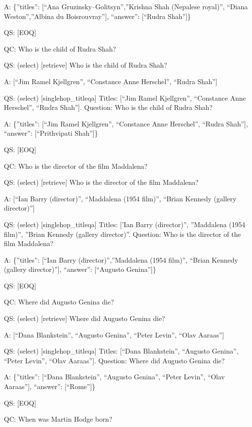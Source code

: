 \documentclass[
]{article}
\begin{document}
A: \{''titles'': {[}``Ana Gruzinsky--Golitsyn'',''Krishna Shah (Nepalese
royal)'', ``Diana Weston'',''Albina du Boisrouvray''{]}, ``answer'':
{[}``Rudra Shah''{]}\}

QS: {[}EOQ{]}

QC: Who is the child of Rudra Shah?

QS: (select) {[}retrieve{]} Who is the child of Rudra Shah?

A: {[}``Jim Ramel Kjellgren'', ``Constance Anne Herschel'', ``Rudra
Shah''{]}

QS: (select) {[}singlehop\_titleqa{]} Titles: {[}``Jim Ramel
Kjellgren'', ``Constance Anne Herschel'', ``Rudra Shah''{]}. Question:
Who is the child of Rudra Shah?

A: \{''titles'': {[}``Jim Ramel Kjellgren'', ``Constance Anne
Herschel'', ``Rudra Shah''{]}, ``answer'': {[}``Prithvipati Shah''{]}\}

QS: {[}EOQ{]}

QC: Who is the director of the film Maddalena?

QS: (select) {[}retrieve{]} Who is the director of the film Maddalena?

A: {[}``Ian Barry (director)'', ``Maddalena (1954 film)'', ``Brian
Kennedy (gallery director)''{]}

QS: (select) {[}singlehop\_titleqa{]} Titles: {[}'Ian Barry
(director)'', ''Maddalena (1954 film)'', ''Brian Kennedy (gallery
director)''. Question: Who is the director of the film Maddalena?

A: \{''titles'': {[}``Ian Barry (director)'',''Maddalena (1954 film)'',
``Brian Kennedy (gallery director)''{]}, ``answer'': {[}``Augusto
Genina''{]}\}

QS: {[}EOQ{]}

QC: Where did Augusto Genina die?

QS: (select) {[}retrieve{]} Where did Augusto Genina die?

A: {[}``Dana Blankstein'', ``Augusto Genina'', ``Peter Levin'', ``Olav
Aaraas''{]}

QS: (select) {[}singlehop\_titleqa{]} Titles: {[}``Dana Blankstein'',
``Augusto Genina'', ``Peter Levin'', ``Olav Aaraas''{]}. Question: Where
did Augusto Genina die?

A: \{''titles'': {[}``Dana Blankstein'', ``Augusto Genina'', ``Peter
Levin'', ``Olav Aaraas''{]}, ``answer'': {[}``Rome''{]}\}

QS: {[}EOQ{]}

QC: When was Martin Hodge born?
\end{document}
